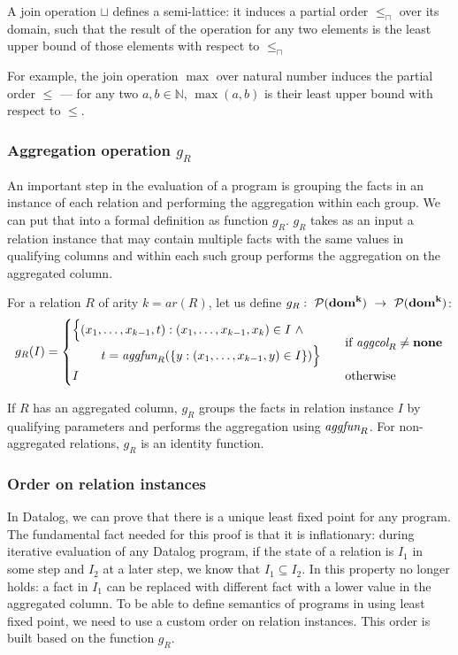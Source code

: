A join operation $\sqcup$ defines a semi-lattice: it induces a partial order $\le_\sqcap$ over its domain, such that the result of the operation for any two elements is the least upper bound of those elements with respect to $\le_\sqcap$

For example, the join operation $\max$ over natural number induces the partial order $\le$ --- for any two $a, b \in \mathbb{N}$, $\max(a, b)$ is their least upper bound with respect to $\le$.

\subsubsection{Aggregation operation $g_R$}
An important step in the evaluation of a \datalogra program is grouping the facts in an instance of each relation and performing the aggregation within each group. We can put that into a formal definition as function $g_R$. $g_R$ takes as an input a relation instance that may contain multiple facts with the same values in  qualifying columns and within each such group performs the aggregation on the aggregated column.
\begin{defn}\label{d:aggregationoperationgr}
For a relation $R$ of arity $k = ar(R)$, let us define $g_R:~\mathcal{P}(\bf{dom}^k)~\to~\mathcal{P}({\bf dom}^k)$:
$$
g_R(I) = \begin{cases}
\!\begin{aligned}%
       \Big\{(x_1, &\dots, x_{k-1}, t): (x_1, \dots, x_{k-1}, x_k) \in I~\wedge & \\
           &t = \aggfun_R(\{y: (x_1, \dots, x_{k-1}, y) \in I\})\Big\}&
    \end{aligned}          & \text{if } \aggcol_R \ne \bf{none} \\
I                          & \text{otherwise}
\end{cases}
$$
\end{defn}

If $R$ has an aggregated column, $g_R$ groups the facts in relation instance $I$ by qualifying parameters and performs the aggregation using $\textit{aggfun}_R$. For non-aggregated relations, $g_R$ is an identity function.

\subsubsection{Order on relation instances}
In Datalog, we can prove that there is a unique least fixed point for any program. The fundamental fact needed for this proof is that it is inflationary: during iterative evaluation of any Datalog program, if the state of a relation is $I_1$ in some step and $I_2$ at a later step, we know that $I_1 \subseteq I_2$. In \datalogra this property no longer holds: a fact in $I_1$ can be replaced with different fact with a lower value in the aggregated column. To be able to define semantics of programs in \datalogra using least fixed point, we need to use a custom order on relation instances. This order is built based on the function $g_R$.


